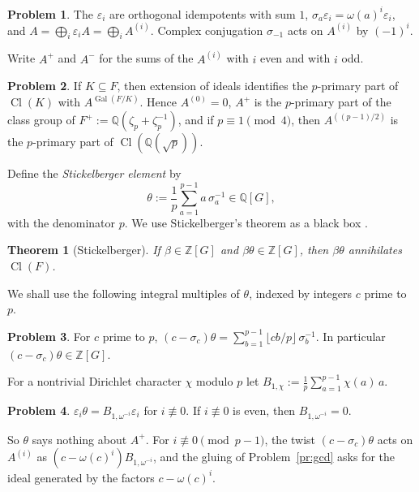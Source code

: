 \documentclass[reqno]{amsart}
\theoremstyle{definition}
\newtheorem{problem}{Problem}[section]
\theoremstyle{plain}
\newtheorem{theorem}{Theorem}[section]
\newcommand{\Z}{\mathbb{Z}}
\newcommand{\Q}{\mathbb{Q}}
\newcommand{\Cl}{\operatorname{Cl}}
\newcommand{\Gal}{\operatorname{Gal}}
\begin{document}
\begin{problem}\label{pr:eigen}
The \(\varepsilon_i\) are orthogonal idempotents with sum \(1\), \(\sigma_a \varepsilon_i = \omega(a)^i \varepsilon_i\), and \(A = \bigoplus_i \varepsilon_i A = \bigoplus_i A^{(i)}\).  Complex conjugation \(\sigma_{-1}\) acts on \(A^{(i)}\) by \((-1)^i\).
\end{problem}

Write \(A^+\) and \(A^-\) for the sums of the \(A^{(i)}\) with \(i\) even and with \(i\) odd.

\begin{problem}\label{pr:subfield}
If \(K \subseteq F\), then extension of ideals identifies the \(p\)-primary part of \(\Cl(K)\) with \(A^{\Gal(F/K)}\).  Hence \(A^{(0)} = 0\), \(A^+\) is the \(p\)-primary part of the class group of \(F^+ := \Q(\zeta_p + \zeta_p^{-1})\), and if \(p \equiv 1 \pmod 4\), then \(A^{((p-1)/2)}\) is the \(p\)-primary part of \(\Cl(\Q(\sqrt{p}))\).
\end{problem}

Define the \emph{Stickelberger element} by
\[
  \theta := \frac1p \sum_{a=1}^{p-1} a \, \sigma_a^{-1} \in \Q[G] ,
\]
with the denominator \(p\).  We use Stickelberger's theorem as a black box \cite[Thm.~6.10]{Wa}.

\begin{theorem}[Stickelberger]\label{thm:stickelberger}
If \(\beta \in \Z[G]\) and \(\beta\theta \in \Z[G]\), then \(\beta\theta\) annihilates \(\Cl(F)\).
\end{theorem}

We shall use the following integral multiples of \(\theta\), indexed by integers \(c\) prime to \(p\).

\begin{problem}\label{pr:c-twist}
For \(c\) prime to \(p\), \((c - \sigma_c)\theta = \sum_{b=1}^{p-1} \lfloor cb/p \rfloor \, \sigma_b^{-1}\).  In particular \((c - \sigma_c)\theta \in \Z[G]\).
\end{problem}

For a nontrivial Dirichlet character \(\chi\) modulo \(p\) let \(B_{1,\chi} := \frac1p \sum_{a=1}^{p-1} \chi(a)\, a\).

\begin{problem}\label{pr:eigen-theta}
\(\varepsilon_i \theta = B_{1,\omega^{-i}} \varepsilon_i\) for \(i \not\equiv 0\).  If \(i \not\equiv 0\) is even, then \(B_{1,\omega^{-i}} = 0\).
\end{problem}

So \(\theta\) says nothing about \(A^+\).  For \(i\not\equiv0\pmod{p-1}\), the twist \((c - \sigma_c)\theta\) acts on \(A^{(i)}\) as \((c - \omega(c)^i)B_{1,\omega^{-i}}\), and the gluing of Problem~\ref{pr:gcd} asks for the ideal generated by the factors \(c - \omega(c)^i\).
\end{document}
